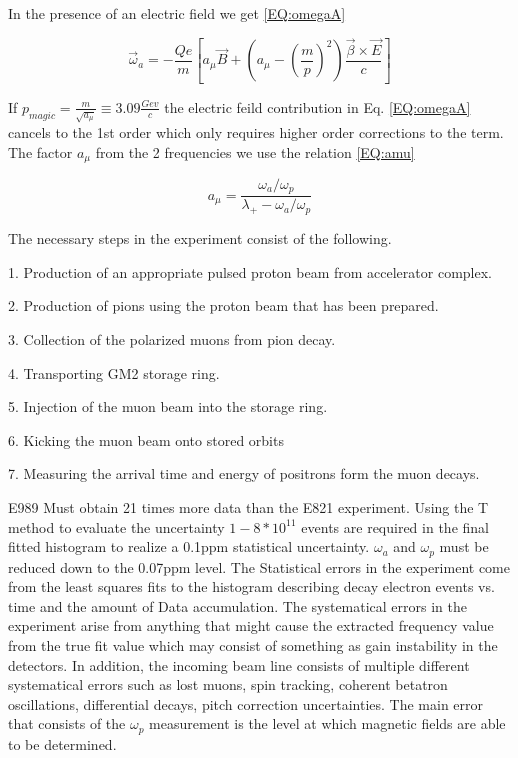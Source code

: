 \documentclass[./Thesis]{subfiles}
\begin{document}
In the presence of an electric field we get \ref{EQ:omegaA}

\begin{equation}\label{EQ:omegaA}
\vec{\omega}_a = -\frac{Qe}{m}[a_{\mu} \vec{B} + (a_{\mu} - (\frac{m}{p})^2) \frac{\vec{\beta} \times \vec{E}}{c}]
\end{equation}


If $p_{magic} = \frac{m}{\sqrt{a_\mu}} \equiv 3.09 \frac{Gev}{c}$ the electric feild contribution in Eq. \ref{EQ:omegaA} cancels to the 1st order which only requires higher order corrections to the term. The factor $a_\mu$ from the 2 frequencies we use the relation \ref{EQ:amu}

\begin{equation}\label{EQ:amu}
a_\mu = \frac{\omega_a / \omega_p}{\lambda_{+} - \omega_a / \omega_p}
\end{equation}

The necessary steps in the experiment consist of the following.


1.	Production of an appropriate pulsed proton beam from accelerator complex.

2.	Production of pions using the proton beam that has been prepared.

3. 	Collection of the polarized muons from pion decay.

4.	Transporting GM2 storage ring.

5. 	Injection of the muon beam into the storage ring.

6. 	Kicking the muon beam onto stored orbits

7.	Measuring the arrival time and energy of positrons form the muon decays.


\vspace{5mm}

E989 Must obtain 21 times more data than the E821 experiment. Using the T method to evaluate the uncertainty $1-8 * 10^11$ events are required in the final fitted histogram to realize a 0.1ppm statistical uncertainty. $\omega_{a}$ and $\omega_{p}$ must be reduced down to the 0.07ppm level. The Statistical errors in the experiment come from the least squares fits to the histogram describing decay electron events vs. time and the amount of Data accumulation. The systematical errors in the experiment arise from anything that might cause the extracted frequency value from the true fit value which may consist of something as gain instability in the detectors.  In addition, the incoming beam line consists of multiple different systematical errors such as lost muons, spin tracking, coherent betatron oscillations, differential decays, pitch correction uncertainties. The main error that consists of the $\omega_{p}$ measurement is the level at which magnetic fields are able to be determined. 
\end{document}
